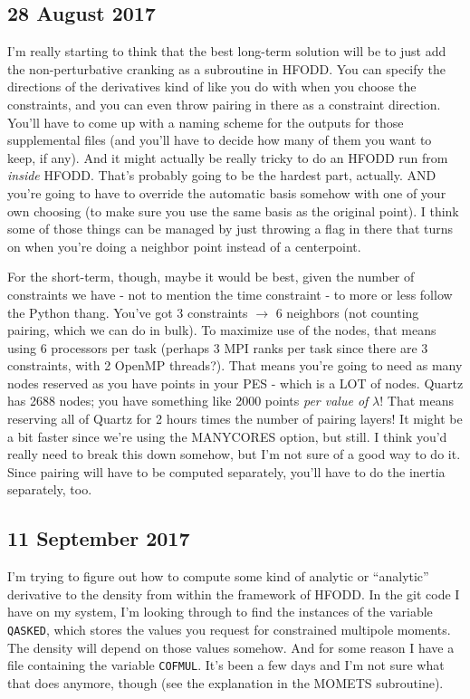 \subsection*{28 August 2017}
I'm really starting to think that the best long-term solution will be to just add the non-perturbative cranking as a subroutine in HFODD. You can specify the directions of the derivatives kind of like you do with when you choose the constraints, and you can even throw pairing in there as a constraint direction. You'll have to come up with a naming scheme for the outputs for those supplemental files (and you'll have to decide how many of them you want to keep, if any). And it might actually be really tricky to do an HFODD run from \textit{inside} HFODD. That's probably going to be the hardest part, actually. AND you're going to have to override the automatic basis somehow with one of your own choosing (to make sure you use the same basis as the original point). I think some of those things can be managed by just throwing a flag in there that turns on when you're doing a neighbor point instead of a centerpoint.

For the short-term, though, maybe it would be best, given the number of constraints we have - not to mention the time constraint - to more or less follow the Python thang. You've got 3 constraints $\rightarrow$ 6 neighbors (not counting pairing, which we can do in bulk). To maximize use of the nodes, that means using 6 processors per task (perhaps 3 MPI ranks per task since there are 3 constraints, with 2 OpenMP threads?). That means you're going to need as many nodes reserved as you have points in your PES - which is a LOT of nodes. Quartz has 2688 nodes; you have something like 2000 points \textit{per value of} $\lambda$! That means reserving all of Quartz for 2 hours times the number of pairing layers! It might be a bit faster since we're using the MANYCORES option, but still. I think you'd really need to break this down somehow, but I'm not sure of a good way to do it. Since pairing will have to be computed separately, you'll have to do the inertia separately, too.

\subsection*{11 September 2017}
I'm trying to figure out how to compute some kind of analytic or ``analytic'' derivative to the density from within the framework of HFODD. In the git code I have on my system, I'm looking through to find the instances of the variable \texttt{QASKED}, which stores the values you request for constrained multipole moments. The density will depend on those values somehow. And for some reason I have a file containing the variable \texttt{COFMUL}. It's been a few days and I'm not sure what that does anymore, though (see the explanation in the MOMETS subroutine).
